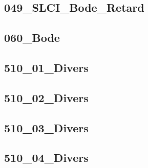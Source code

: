 \subsection{049\_SLCI\_Bode\_Retard}
\graphicspath{{../05-Modélisation Systèmes Asservis/TD/SLCI/Bode/049_SLCI_Bode_Retard/images/}{../05-Modélisation Systèmes Asservis/TD/SLCI/Bode/049_SLCI_Bode_Retard/}{../Style/png/}}


\subsection{060\_Bode}
\graphicspath{{../05-Modélisation Systèmes Asservis/TD/SLCI/Bode/060_Bode/images/}{../05-Modélisation Systèmes Asservis/TD/SLCI/Bode/060_Bode/}{../Style/png/}}


\subsection{510\_01\_Divers}
\graphicspath{{../05-Modélisation Systèmes Asservis/TD/SLCI/Bode/510_01_Divers/images/}{../05-Modélisation Systèmes Asservis/TD/SLCI/Bode/510_01_Divers/}{../Style/png/}}


\subsection{510\_02\_Divers}
\graphicspath{{../05-Modélisation Systèmes Asservis/TD/SLCI/Bode/510_02_Divers/images/}{../05-Modélisation Systèmes Asservis/TD/SLCI/Bode/510_02_Divers/}{../Style/png/}}


\subsection{510\_03\_Divers}
\graphicspath{{../05-Modélisation Systèmes Asservis/TD/SLCI/Bode/510_03_Divers/images/}{../05-Modélisation Systèmes Asservis/TD/SLCI/Bode/510_03_Divers/}{../Style/png/}}


\subsection{510\_04\_Divers}
\graphicspath{{../05-Modélisation Systèmes Asservis/TD/SLCI/Bode/510_04_Divers/images/}{../05-Modélisation Systèmes Asservis/TD/SLCI/Bode/510_04_Divers/}{../Style/png/}}


